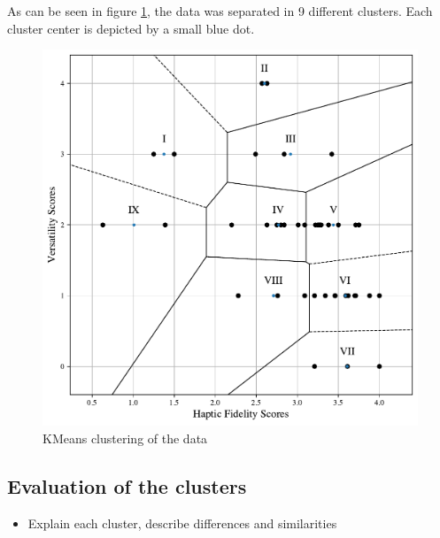 As can be seen in figure \ref{fig:kmeans}, the data was separated in 9 different clusters. Each cluster center is depicted by a small blue dot.

\begin{figure}[htbp]
    \centering
    \includegraphics[width=\columnwidth]{figures/literature_data.pdf} 
    \caption{KMeans clustering of the data}
    \label{fig:kmeans}
\end{figure}


\subsection{Evaluation of the clusters}
\begin{itemize}
    \item Explain each cluster, describe differences and similarities
\end{itemize}

